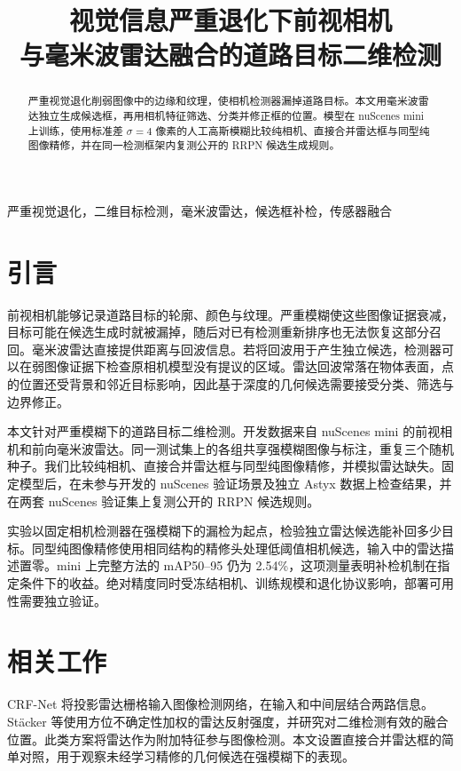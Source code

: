 \documentclass[conference,10pt,a4paper]{IEEEtran}
\providecommand{\ReportAuthors}{作者姓名\enspace\rule{3.2em}{.35pt}\quad 学号\enspace\rule{4.2em}{.35pt}}
\providecommand{\Contribution}{作者排序与贡献\enspace\rule{14em}{.35pt}}
\begin{document}
\title{视觉信息严重退化下前视相机\\与毫米波雷达融合的道路目标二维检测}
\author{\IEEEauthorblockN{\ReportAuthors}\IEEEauthorblockA{\Contribution}}
\maketitle

\begin{abstract}
严重视觉退化削弱图像中的边缘和纹理，使相机检测器漏掉道路目标。本文用毫米波雷达独立生成候选框，再用相机特征筛选、分类并修正框的位置。模型在 nuScenes mini 上训练，使用标准差 $\sigma=4$ 像素的人工高斯模糊比较纯相机、直接合并雷达框与同型纯图像精修，并在同一检测框架内复测公开的 RRPN 候选生成规则。\AbstractResult{} \ExpansionAbstract{}
\end{abstract}

\begin{IEEEkeywords}
严重视觉退化，二维目标检测，毫米波雷达，候选框补检，传感器融合
\end{IEEEkeywords}

\section{引言}
前视相机能够记录道路目标的轮廓、颜色与纹理。严重模糊使这些图像证据衰减，目标可能在候选生成时就被漏掉，随后对已有检测重新排序也无法恢复这部分召回。毫米波雷达直接提供距离与回波信息。若将回波用于产生独立候选，检测器可以在弱图像证据下检查原相机模型没有提议的区域。雷达回波常落在物体表面，点的位置还受背景和邻近目标影响，因此基于深度的几何候选需要接受分类、筛选与边界修正。

本文针对严重模糊下的道路目标二维检测。开发数据来自 nuScenes mini\cite{nuscenes} 的前视相机和前向毫米波雷达。同一测试集上的各组共享强模糊图像与标注，重复三个随机种子。我们比较纯相机、直接合并雷达框与同型纯图像精修，并模拟雷达缺失。固定模型后，在未参与开发的 nuScenes 验证场景及独立 Astyx 数据上检查结果，并在两套 nuScenes 验证集上复测公开的 RRPN 候选规则。

实验以固定相机检测器在强模糊下的漏检为起点，检验独立雷达候选能补回多少目标。同型纯图像精修使用相同结构的精修头处理低阈值相机候选，输入中的雷达描述置零。mini 上完整方法的 mAP50--95 仍为 2.54\%，这项测量表明补检机制在指定条件下的收益。绝对精度同时受冻结相机、训练规模和退化协议影响，部署可用性需要独立验证。

\section{相关工作}
CRF-Net 将投影雷达栅格输入图像检测网络，在输入和中间层结合两路信息\cite{nobis}。Stäcker 等使用方位不确定性加权的雷达反射强度，并研究对二维检测有效的融合位置\cite{stacker}。此类方案将雷达作为附加特征参与图像检测。本文设置直接合并雷达框的简单对照，用于观察未经学习精修的几何候选在强模糊下的表现。
\end{document}
